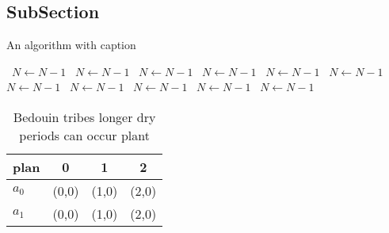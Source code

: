 \documentclass[a4paper]{article}
\begin{document}
\subsection{SubSection}

\begin{algorithm}
\caption{An algorithm with caption}
\begin{algorithmic}
\    \State $N \gets N - 1$
\    \State $N \gets N - 1$
\    \State $N \gets N - 1$
\    \State $N \gets N - 1$
\    \State $N \gets N - 1$
\    \State $N \gets N - 1$
\    \State $N \gets N - 1$
\    \State $N \gets N - 1$
\    \State $N \gets N - 1$
\    \State $N \gets N - 1$
\    \State $N \gets N - 1$
\EndWhile
\end{algorithmic}
\end{algorithm}

\begin{table}
\begin{adjustbox}{width=0.6\columnwidth}
\begin{tabular}{|l|l|l|l|}
\hline
\textbf{plan} & \multicolumn{1}{c|}{\textbf{0}} & \multicolumn{1}{c|}{\textbf{1}} & \multicolumn{1}{c|}{\textbf{2}} \\ \hline
\textbf{$a_0$}  & (0,0) & (1,0) & (2,0) \\ \hline
\textbf{$a_1$}  & (0,0) & (1,0) & (2,0) \\ \hline
\end{tabular}
\end{adjustbox}
\caption{Bedouin tribes longer dry periods can occur plant
}
\end{table}
\end{document}
